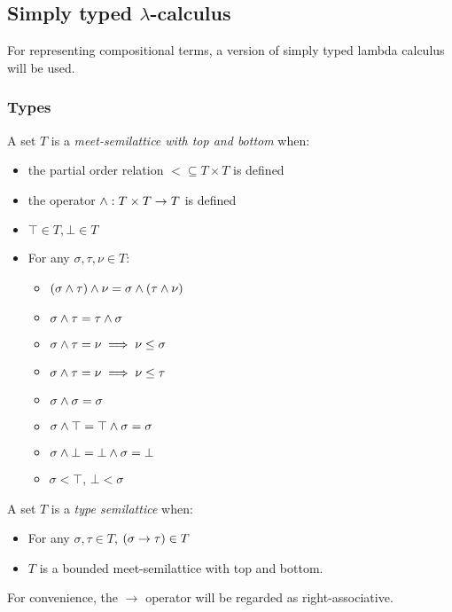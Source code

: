 \documentclass[main.tex]{subfiles}
\begin{document}
\subsection{Simply typed $\lambda$-calculus}

For representing compositional terms, a version of simply typed lambda calculus
will be used.

\subsubsection{Types}
\begin{defn}
    A set $T$ is a \emph{meet-semilattice with top and bottom} when:
    \begin{itemize}
        \item the partial order relation
            $\less \subseteq T \times T$ is defined
        \item the operator $\wedge : T \times T \rightarrow T$ is defined
        \item $\top \in T, \bot \in T$
        \item For any $\sigma, \tau, \nu \in T$:
            \begin{itemize}
                \item $(\sigma \wedge \tau) \wedge \nu = \sigma \wedge (\tau \wedge \nu)$
                \item $\sigma \wedge \tau = \tau \wedge \sigma$
                \item $\sigma \wedge \tau = \nu \implies \nu \leq \sigma$
                \item $\sigma \wedge \tau = \nu \implies \nu \leq \tau$
                \item $\sigma \wedge \sigma = \sigma$
                \item $\sigma \wedge \top = \top \wedge \sigma = \sigma$
                \item $\sigma \wedge \bot = \bot \wedge \sigma = \bot$
                \item $\sigma \less \top$, $\bot \less \sigma$
            \end{itemize}
    \end{itemize}

\end{defn}

\begin{defn}
    A set $T$ is a \emph{type semilattice} when:
    \begin{itemize}
        \item For any $\sigma, \tau \in T$, $(\sigma \rightarrow \tau) \in T$
        \item $T$ is a bounded meet-semilattice with top and bottom.
    \end{itemize}

    For convenience, the $\rightarrow$ operator will be regarded as
    right-associative.
\end{defn}
\end{document}
